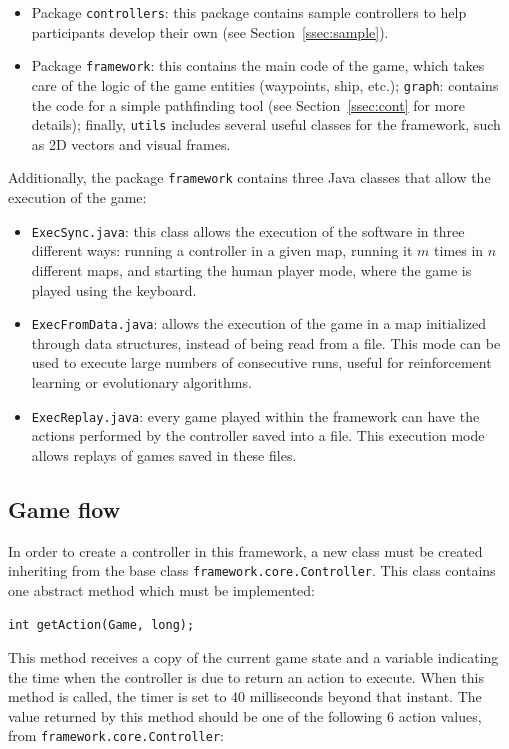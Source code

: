 \documentclass[conference]{IEEEtran}
\newcommand{\code}[1]{{\lstinline!#1!}}
\begin{document}
\begin{itemize}
\item Package \code{controllers}: this package contains sample controllers to help participants develop their own (see Section~\ref{ssec:sample}).
\item Package \code{framework}: this contains the main code of the game, which takes care of the logic of the game entities (waypoints, ship, etc.); \code{graph}: contains the code for a simple pathfinding tool (see Section~\ref{ssec:cont} for more details); finally, \code{utils} includes several useful classes for the framework, such as 2D vectors and visual frames.
\end{itemize}

Additionally, the package \code{framework} contains three Java classes that allow the execution of the game:

\begin{itemize}
\item \code{ExecSync.java}: this class allows the execution of the software in three different ways: running a controller in a given map, running it $m$ times in $n$ different maps, and starting the human player mode, where the game is played using the keyboard.
\item \code{ExecFromData.java}: allows the execution of the game in a map initialized through data structures, instead of being read from a file. This mode can be used to execute large numbers of consecutive runs, useful for reinforcement learning or evolutionary algorithms.
\item \code{ExecReplay.java}: every game played within the framework can have the actions performed by the controller saved into a file. This execution mode allows replays of games saved in these files.
\end{itemize}

\subsection{Game flow}

In order to create a controller in this framework, a new class must be created inheriting from the base class \code{framework.core.Controller}. This class contains one abstract method which must be implemented: 

\begin{center}
\code{int getAction(Game, long);}
\end{center}

This method receives a copy of the current game state and a variable indicating the time when the controller is due to return an action to execute. When this method is called, the timer is set to $40$ milliseconds beyond that instant. The value returned by this method should be one of the following $6$ action values, from \code{framework.core.Controller}:
\end{document}
